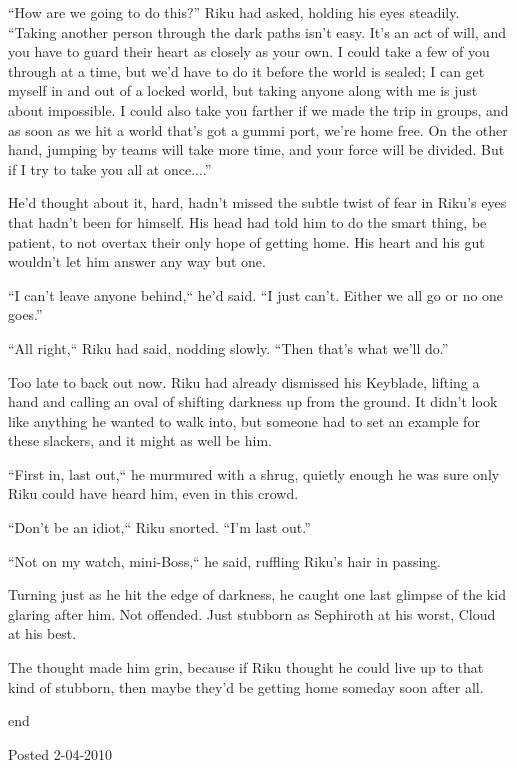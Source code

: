 ``How are we going to do this?'' Riku had asked, holding his eyes steadily. ``Taking another person through the dark paths isn't easy. It's an act of will, and you have to guard their heart as closely as your own. I could take a few of you through at a time, but we'd have to do it before the world is sealed; I can get myself in and out of a locked world, but taking anyone along with me is just about impossible. I could also take you farther if we made the trip in groups, and as soon as we hit a world that's got a gummi port, we're home free. On the other hand, jumping by teams will take more time, and your force will be divided. But if I try to take you all at once....''

He'd thought about it, hard, hadn't missed the subtle twist of fear in Riku's eyes that hadn't been for himself. His head had told him to do the smart thing, be patient, to not overtax their only hope of getting home. His heart and his gut wouldn't let him answer any way but one.

``I can't leave anyone behind,`` he'd said. ``I just can't. Either we all go or no one goes.''

``All right,`` Riku had said, nodding slowly. ``Then that's what we'll do.''

Too late to back out now. Riku had already dismissed his Keyblade, lifting a hand and calling an oval of shifting darkness up from the ground. It didn't look like anything he wanted to walk into, but someone had to set an example for these slackers, and it might as well be him.

``First in, last out,`` he murmured with a shrug, quietly enough he was sure only Riku could have heard him, even in this crowd.

``Don't be an idiot,`` Riku snorted. ``I'm last out.''

``Not on my watch, mini-Boss,`` he said, ruffling Riku's hair in passing.

Turning just as he hit the edge of darkness, he caught one last glimpse of the kid glaring after him. Not offended. Just stubborn as Sephiroth at his worst, Cloud at his best.

The thought made him grin, because if Riku thought he could live up to that kind of stubborn, then maybe they'd be getting home someday soon after all.


end

Posted 2-04-2010